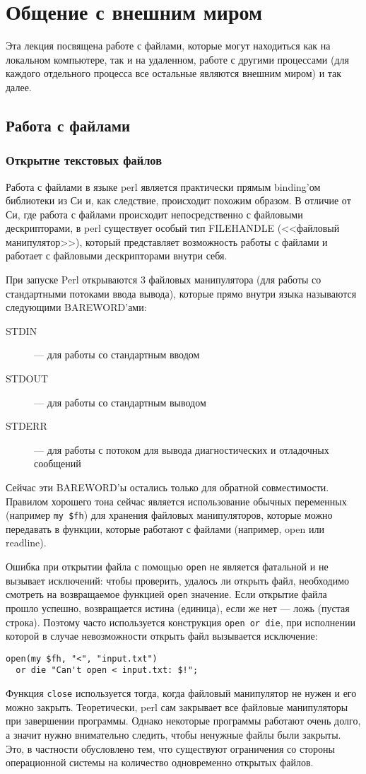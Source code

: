 \setcounter{chapter}{4}
\chapter{Общение с внешним миром}
Эта лекция посвящена работе с файлами, которые могут находиться как на локальном компьютере, так и на удаленном, работе с другими процессами (для каждого отдельного процесса все остальные являются внешним миром) и так далее.

\section{Работа с файлами}
\subsection{Открытие текстовых файлов}
Работа с файлами в языке perl является практически прямым binding'ом библиотеки из Си и, как следствие, происходит похожим образом. В отличие от Си, где работа с файлами происходит непосредственно с файловыми дескрипторами, в perl существует особый тип FILEHANDLE (<<файловый манипулятор>>), который представляет возможность работы с файлами и работает с файловыми дескрипторами внутри себя.

При запуске Perl открываются 3 файловых манипулятора (для работы со стандартными потоками ввода вывода), которые прямо внутри языка называются следующими BAREWORD'ами:
\begin{description}
  \item[STDIN] --- для работы со стандартным вводом
  \item[STDOUT] --- для работы со стандартным выводом
  \item[STDERR] --- для работы с потоком для вывода диагностических и отладочных сообщений
\end{description}
Сейчас эти BAREWORD'ы остались только для обратной совместимости. Правилом хорошего тона сейчас является использование обычных переменных (например \verb|my $fh|) для хранения файловых манипуляторов, которые можно передавать в функции, которые работают с файлами (например, open или readline).

Ошибка при открытии файла с помощью \verb|open| не является фатальной и не вызывает исключений: чтобы проверить, удалось ли открыть файл, необходимо смотреть на возвращаемое функцией \verb|open| значение. Если открытие файла прошло успешно, возвращается истина (единица), если же нет --- ложь (пустая строка). Поэтому часто используется конструкция \verb|open or die|, при исполнении которой в случае невозможности открыть файл вызывается исключение:
\begin{verbatim}
open(my $fh, "<", "input.txt")
  or die "Can't open < input.txt: $!";
\end{verbatim}
Функция \verb|close| используется тогда, когда файловый манипулятор не нужен и его можно закрыть. Теоретически, perl сам закрывает все файловые манипуляторы при завершении программы. Однако некоторые программы работают очень долго, а значит нужно внимательно следить, чтобы ненужные файлы были закрыты. Это, в частности обусловлено тем, что существуют ограничения со стороны операционной системы на количество одновременно открытых файлов.

